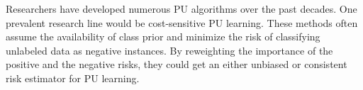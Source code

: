 \documentclass[final]{cvpr}
\newcommand{\bangyan}[1]{#1}
\newcommand{\yunrui}[1]{#1}
\begin{document}
\yunrui{Researchers} have developed numerous PU algorithms over the past decades. 
One prevalent \yunrui{research line} would be cost-sensitive PU learning. These methods \cite{DBLP:conf/nips/PlessisNS14,DBLP:conf/icml/PlessisNS15,DBLP:conf/nips/KiryoNPS17,DBLP:conf/ijcai/SuCX21} often assume the availability of class prior and \bangyan{minimize the risk of classifying} unlabeled data as negative \yunrui{instances}. By reweighting the importance of the positive and the negative risks, they could get an either unbiased or consistent risk estimator for PU learning. 
\end{document}
